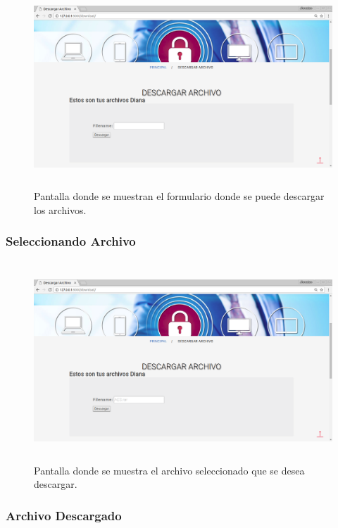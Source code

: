 			\begin{figure}[H]
			\centering
			\includegraphics[width=14cm, height=7.5cm]{./images/Implementacion/DescargarArchivo.png}
			\caption{Pantalla donde se muestran el formulario donde se puede descargar los archivos.}
			\label{fig:6-1-31} 
			\end{figure}

\subsubsection{Seleccionando Archivo}

			\begin{figure}[H]
			\centering
			\includegraphics[width=14cm, height=7.5cm]{./images/Implementacion/DescargarArchivoSeleccionado.png}
			\caption{Pantalla donde se muestra el archivo seleccionado que se desea descargar.}
			\label{fig:6-1-32} 
			\end{figure}

\subsubsection{Archivo Descargado}

